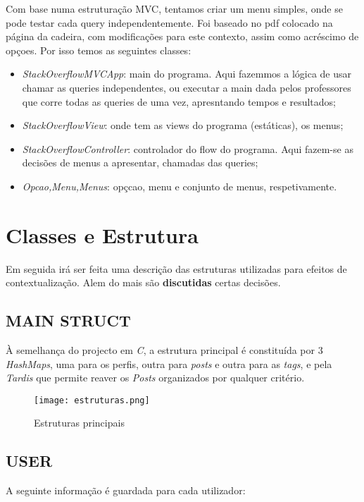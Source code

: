 \documentclass[letterpaper, 10 pt, conference]{IEEEtran} %
\begin{document}
Com base numa estruturação MVC, tentamos criar um menu simples, onde se pode testar cada query independentemente. Foi baseado no pdf colocado na página da cadeira,
com modificações para este contexto, assim como acréscimo de opçoes.
Por isso temos as seguintes classes:
\begin{itemize}
    \item \textit{StackOverflowMVCApp}: main do programa. Aqui fazemmos a lógica de usar chamar as queries independentes, ou executar a main dada pelos professores que corre todas as queries de uma vez, apresntando tempos e resultados;
    \item \textit{StackOverflowView}: onde tem as views do programa (estáticas), os menus;
    \item \textit{StackOverflowController}: controlador do flow do programa. Aqui fazem-se as decisões de menus a apresentar, chamadas das queries;
    \item \textit{Opcao,Menu,Menus}: opçcao, menu e conjunto de menus, respetivamente.
\end{itemize}

\section{Classes e Estrutura}

Em seguida irá ser feita uma descrição das estruturas utilizadas para efeitos de contextualização. Alem do mais são \textbf{discutidas} certas decisões.

\subsection{MAIN STRUCT}
À semelhança do projecto em \textit{C}, a estrutura principal é constituída por 3 \textit{HashMaps}, uma para os perfis, outra para \textit{posts} e outra para as \textit{tags}, e pela \textit{Tardis} que permite reaver os \textit{Posts} organizados por qualquer critério.
\newline

\begin{figure}[h!]
  \centering
  \texttt{[image: estruturas.png]}
   \caption{Estruturas principais}
\end{figure}

\subsection{USER}
A seguinte informação é guardada para cada utilizador:
\newline
\end{document}
